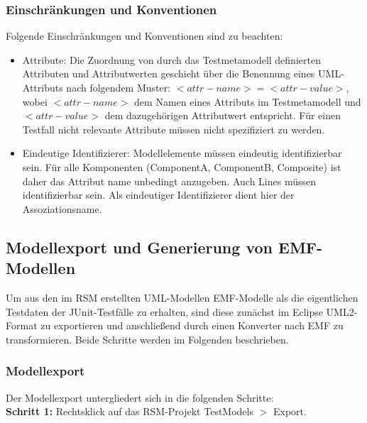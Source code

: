 \subsubsection{Einschränkungen und Konventionen}
Folgende Einschränkungen und Konventionen sind zu beachten:
\begin{itemize}
 \item Attribute: Die Zuordnung von durch das Testmetamodell definierten Attributen und Attributwerten geschieht über die Benennung eines UML-Attributs nach folgendem Muster: $<attr-name>=<attr-value>$, wobei $<attr-name>$ dem Namen eines Attributs im Testmetamodell und $<attr-value>$ dem dazugehörigen Attributwert entspricht. Für einen Testfall nicht relevante Attribute müssen nicht spezifiziert zu werden. 
 \item Eindeutige Identifizierer: Modellelemente müssen eindeutig identifizierbar sein. Für alle Komponenten (ComponentA, ComponentB, Composite) ist daher das Attribut name unbedingt anzugeben. Auch Lines müssen identifizierbar sein. Als eindeutiger Identifizierer dient hier der Assoziationsname.
\end{itemize}

\subsection{Modellexport und Generierung von EMF-Modellen}
Um aus den im RSM erstellten UML-Modellen EMF-Modelle als die eigentlichen Testdaten der JUnit-Testfälle zu erhalten, sind diese zunächst im Eclipse UML2-Format zu exportieren und anschließend durch einen Konverter nach EMF zu transformieren. Beide Schritte werden im Folgenden beschrieben.

\subsubsection{Modellexport} Der Modellexport untergliedert sich in die folgenden Schritte:\\

\textbf{Schritt 1:} Rechtsklick auf das RSM-Projekt TestModels $>$ Export.\\


